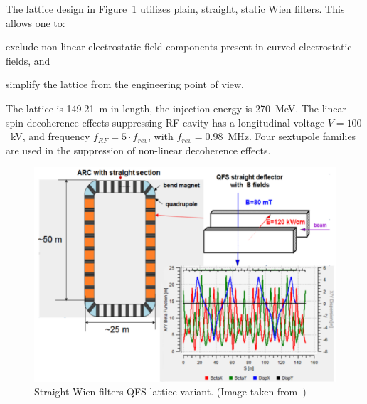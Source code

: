 The lattice design in Figure~\ref{fig:QFS_E+B_lattice} utilizes plain, straight, static Wien filters.
This allows one to:
\begin{enumerate*}
	\item exclude non-linear electrostatic field components present in curved electrostatic fields, and 
	\item simplify the lattice from the engineering point of view.
\end{enumerate*}

The lattice is 149.21~m in length, the injection energy is 270~MeV. 
The linear spin decoherence effects suppressing RF cavity has a longitudinal voltage $V = 100$~kV, 
and frequency $f_{RF} = 5\cdot f_{rev}$, with $f_{rev} = 0.98$~MHz. 
Four sextupole families are used in the suppression of non-linear decoherence effects.
\begin{figure}[h!]
	\centering
	\includegraphics[width=\linewidth]{images/chapter2/E+B_lattice}
	\caption{Straight Wien filters QFS lattice variant.
          (Image taken from~\cite{Senichev:Lattices})\label{fig:QFS_E+B_lattice}}
\end{figure}

